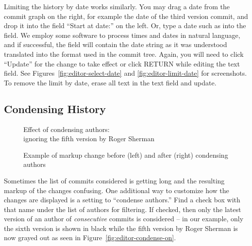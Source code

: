 Limiting the history by date works similarly.  You may drag a date from the commit graph on the right, for example the date of the third version commit, and drop it into the field ``Start at date:'' on the left.  Or, type a date such as  into the field.  We employ some software to process times and dates in natural language, and if successful, the field will contain the date string as it was understood translated into the format used in the commit tree.
Again, you will need to click ``Update'' for the change to take effect or click RETURN while editing the text field.  See Figures~\ref{fig:editor-select-date} and \ref{fig:editor-limit-date} for screenshots. To remove the limit by date, erase all text in the text field and update.

\subsection{Condensing History}

\begin{figure}
\centering
  \begin{minipage}[b]{0.57\linewidth}
    \centering
    \caption{Effect of condensing authors:\\ ignoring the fifth version by Roger Sherman} \label{fig:editor-condense-on}  
  \end{minipage}  
\hspace{0.04\linewidth}%
  \begin{minipage}[b]{0.38\linewidth}
  \hspace{1em}
    \caption{Example of markup change before (left) and after (right) condensing authors} \label{fig:editor-condense-before-after}
  \end{minipage}%
\end{figure}
Sometimes the list of commits considered is getting long and the resulting markup of the changes confusing.  One additional way to customize how the changes are displayed is a setting to ``condense authors.''  Find a check box with that name under the list of authors for filtering.  If checked, then only the latest version of an author of \textit{consecutive} commits is considered -- in our example, only the sixth version is shown in black while the fifth version by Roger Sherman is now grayed out as seen in Figure~\ref{fig:editor-condense-on}.

